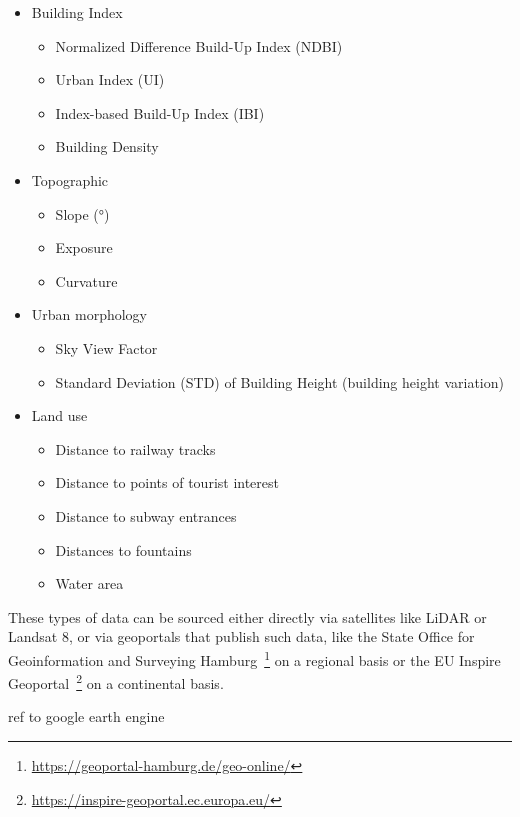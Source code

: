 \begin{itemize}
    \item Building Index
    \begin{itemize}
        \item Normalized Difference Build-Up Index (NDBI)
        \item Urban Index (UI)
        \item Index-based Build-Up Index (IBI)
        \item Building Density
    \end{itemize}
    \item Topographic
    \begin{itemize}
        \item Slope (°)
        \item Exposure
        \item Curvature
    \end{itemize}
    \item Urban morphology
    \begin{itemize}
        \item Sky View Factor
        \item Standard Deviation (STD) of Building Height (building height variation)
    \end{itemize}
    \item Land use
    \begin{itemize}
        \item Distance to railway tracks
        \item Distance to points of tourist interest
        \item Distance to subway entrances
        \item Distances to fountains
        \item Water area
    \end{itemize}
\end{itemize}

These types of data can be sourced either directly via satellites like LiDAR or Landsat 8, or via geoportals that publish such data, like the State Office for Geoinformation and Surveying Hamburg~\footnote{\url{https://geoportal-hamburg.de/geo-online/}} on a regional basis or the EU Inspire Geoportal~\footnote{\url{https://inspire-geoportal.ec.europa.eu/}} on a continental basis.

ref to google earth engine~\cite{gorelick2017google}
